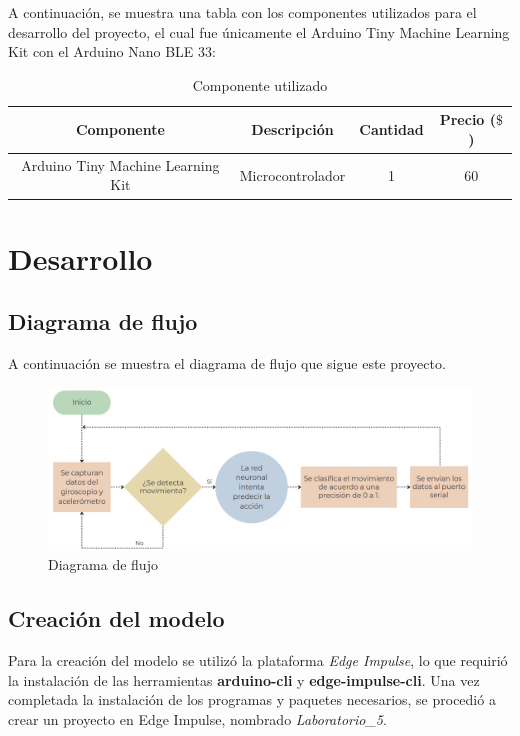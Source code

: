\documentclass[12pt,a4paper]{article}
\begin{document}
A continuación, se muestra una tabla con los componentes utilizados para el desarrollo del proyecto, el cual fue únicamente el Arduino Tiny Machine Learning Kit con el Arduino Nano BLE 33:

\begin{table}[H]
\centering
\caption{Componente utilizado}
\begin{tabular}{|c|c|c|c|}
\hline
\textbf{Componente}   & \textbf{Descripción} & \textbf{Cantidad} & \textbf{Precio ($\$$)} \\ \hline
Arduino Tiny Machine Learning Kit          & Microcontrolador     & 1 &    60     \\ \hline
\end{tabular}

\end{table}


\section{Desarrollo}

\subsection{Diagrama de flujo}

A continuación se muestra el diagrama de flujo que sigue este proyecto.


\begin{figure}[H]
    \centering
    \includegraphics[width=1\linewidth]{Imagenes/diagrama.png}
    \caption{Diagrama de flujo}
    \label{flujo}
\end{figure}

\subsection{Creación del modelo}  
Para la creación del modelo se utilizó la plataforma \textit{Edge Impulse}, lo que requirió la instalación de las herramientas \textbf{arduino-cli} y \textbf{edge-impulse-cli}. Una vez completada la instalación de los programas y paquetes necesarios, se procedió a crear un proyecto en Edge Impulse, nombrado \textit{Laboratorio\_5}.  
\end{document}
